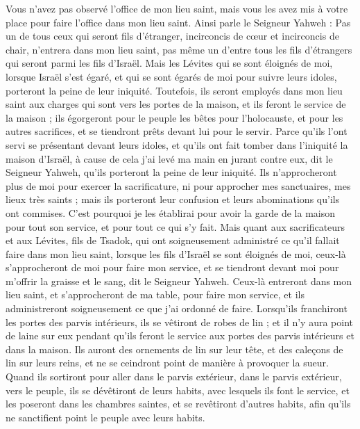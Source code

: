 \begin{multicols}{2}
Vous n'avez pas observé l'office de mon lieu saint, mais vous les avez mis à votre place pour faire l'office dans mon lieu saint.
Ainsi parle le Seigneur Yahweh : Pas un de tous ceux qui seront fils d'étranger, incirconcis de cœur et incirconcis de chair, n'entrera dans mon lieu saint, pas même un d'entre tous les fils d'étrangers qui seront parmi les fils d'Israël.
Mais les Lévites qui se sont éloignés de moi, lorsque Israël s'est égaré, et qui se sont égarés de moi pour suivre leurs idoles, porteront la peine de leur iniquité.
Toutefois, ils seront employés dans mon lieu saint aux charges qui sont vers les portes de la maison, et ils feront le service de la maison ; ils égorgeront pour le peuple les bêtes pour l'holocauste, et pour les autres sacrifices, et se tiendront prêts devant lui pour le servir.
Parce qu'ils l'ont servi se présentant devant leurs idoles, et qu'ils ont fait tomber dans l'iniquité la maison d'Israël, à cause de cela j'ai levé ma main en jurant contre eux, dit le Seigneur Yahweh, qu'ils porteront la peine de leur iniquité.
Ils n'approcheront plus de moi pour exercer la sacrificature, ni pour approcher mes sanctuaires, mes lieux très saints ; mais ils porteront leur confusion et leurs abominations qu'ils ont commises.
C'est pourquoi je les établirai pour avoir la garde de la maison pour tout son service, et pour tout ce qui s'y fait.
Mais quant aux sacrificateurs et aux Lévites, fils de Tsadok, qui ont soigneusement administré ce qu'il fallait faire dans mon lieu saint, lorsque les fils d'Israël se sont éloignés de moi, ceux-là s'approcheront de moi pour faire mon service, et se tiendront devant moi pour m'offrir la graisse et le sang, dit le Seigneur Yahweh.
Ceux-là entreront dans mon lieu saint, et s'approcheront de ma table, pour faire mon service, et ils administreront soigneusement ce que j'ai ordonné de faire.
Lorsqu'ils franchiront les portes des parvis intérieurs, ils se vêtiront de robes de lin ; et il n'y aura point de laine sur eux pendant qu'ils feront le service aux portes des parvis intérieurs et dans la maison.
Ils auront des ornements de lin sur leur tête, et des caleçons de lin sur leurs reins, et ne se ceindront point de manière à provoquer la sueur.
Quand ils sortiront pour aller dans le parvis extérieur, dans le parvis extérieur, vers le peuple, ils se dévêtiront de leurs habits, avec lesquels ils font le service, et les poseront dans les chambres saintes, et se revêtiront d'autres habits, afin qu'ils ne sanctifient point le peuple avec leurs habits.

\end{multicols}
